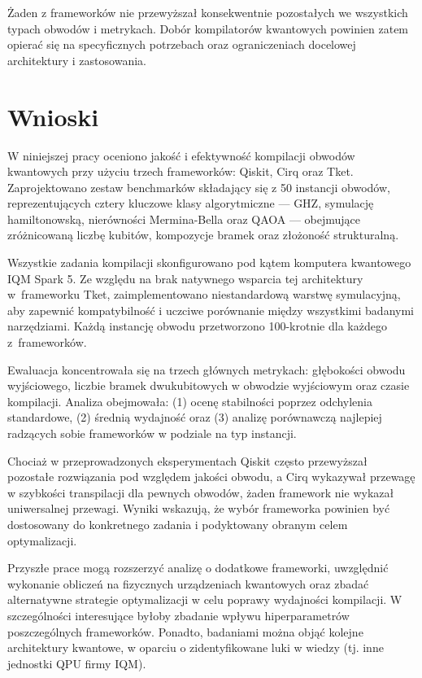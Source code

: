 Żaden z frameworków nie przewyższał konsekwentnie pozostałych we wszystkich typach obwodów i metrykach. Dobór kompilatorów kwantowych powinien zatem opierać się na specyficznych potrzebach oraz ograniczeniach docelowej architektury i zastosowania.

\section{Wnioski}
\label{sec:conclusions20}
W niniejszej pracy oceniono jakość i efektywność kompilacji obwodów kwantowych przy użyciu trzech frameworków: Qiskit, Cirq oraz Tket. Zaprojektowano zestaw benchmarków składający się z 50 instancji obwodów, reprezentujących cztery kluczowe klasy algorytmiczne --- GHZ, symulację hamiltonowską, nierówności Mermina-Bella oraz QAOA --- obejmujące zróżnicowaną liczbę kubitów, kompozycje bramek oraz złożoność strukturalną.

Wszystkie zadania kompilacji skonfigurowano pod kątem komputera kwantowego IQM Spark 5. Ze względu na brak natywnego wsparcia tej architektury w~frameworku Tket, zaimplementowano niestandardową warstwę symulacyjną, aby zapewnić kompatybilność i uczciwe porównanie między wszystkimi badanymi narzędziami. Każdą instancję obwodu przetworzono 100-krotnie dla każdego z~frameworków.

Ewaluacja koncentrowała się na trzech głównych metrykach: głębokości obwodu wyjściowego, liczbie bramek dwukubitowych w obwodzie wyjściowym oraz czasie kompilacji. Analiza obejmowała: (1) ocenę stabilności poprzez odchylenia standardowe, (2) średnią wydajność oraz (3) analizę porównawczą najlepiej radzących sobie frameworków w podziale na typ instancji.

Chociaż w przeprowadzonych eksperymentach Qiskit często przewyższał pozostałe rozwiązania pod względem jakości obwodu, a Cirq wykazywał przewagę w szybkości transpilacji dla pewnych obwodów, żaden framework nie wykazał uniwersalnej przewagi. Wyniki wskazują, że wybór frameworka powinien być dostosowany do konkretnego zadania i podyktowany obranym celem optymalizacji.

Przyszłe prace mogą rozszerzyć analizę o dodatkowe frameworki, uwzględnić wykonanie obliczeń na fizycznych urządzeniach kwantowych oraz zbadać alternatywne strategie optymalizacji w celu poprawy wydajności kompilacji. W szczególności interesujące byłoby zbadanie wpływu hiperparametrów poszczególnych frameworków. Ponadto, badaniami można objąć kolejne architektury kwantowe, w oparciu o zidentyfikowane luki w wiedzy (tj. inne jednostki QPU firmy IQM).

